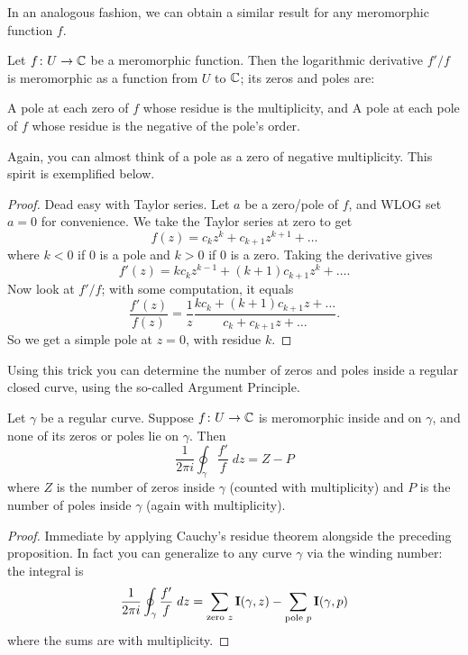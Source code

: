 In an analogous fashion, we can obtain a similar result for any meromorphic function $f$.
\begin{proposition}
	Let $f \colon U \to \mathbb C$ be a meromorphic function.
	Then the logarithmic derivative $f'/f$ is meromorphic as a function from $U$ to $\mathbb C$;
	its zeros and poles are:
	\begin{enumerate}[(i)]
		\ii A pole at each zero of $f$ whose residue is the multiplicity, and
		\ii A pole at each pole of $f$ whose residue is the negative of the pole's order.
	\end{enumerate}
\end{proposition}
Again, you can almost think of a pole as a zero of negative multiplicity.
This spirit is exemplified below.
\begin{proof}
	Dead easy with Taylor series.
	Let $a$ be a zero/pole of $f$, and WLOG set $a=0$ for convenience.
	We take the Taylor series at zero to get
	\[ f(z) = c_k z^k + c_{k+1} z^{k+1} + \dots \] %
	where $k < 0$ if $0$ is a pole and $k > 0$ if $0$ is a zero.
	Taking the derivative gives
	\[ f'(z) = kc_k z^{k-1} + (k+1)c_{k+1}z^{k} + \dots. \]
	Now look at $f'/f$; with some computation, it equals
	\[
		\frac{f'(z)}{f(z)}
		= \frac 1z \frac{kc_k + (k+1)c_{k+1}z + \dots}{c_k + c_{k+1}z + \dots}.
	\]
	So we get a simple pole at $z=0$, with residue $k$.
\end{proof}

Using this trick you can determine the number of zeros and poles inside a regular closed curve,
using the so-called Argument Principle.

\begin{theorem}
	\label{thm:arg_principle}
	Let $\gamma$ be a regular curve.
	Suppose $f \colon U \to \mathbb C$ is meromorphic inside and on $\gamma$, and
	none of its zeros or poles lie on $\gamma$.
	Then
	\[
		\frac{1}{2\pi i} \oint_\gamma \frac{f'}{f} \; dz
		= Z - P
	\]
	where $Z$ is the number of zeros inside $\gamma$ (counted with multiplicity)
	and $P$ is the number of poles inside $\gamma$ (again with multiplicity).
\end{theorem}
\begin{proof}
	Immediate by applying Cauchy's residue theorem alongside the preceding proposition.
	In fact you can generalize to any curve $\gamma$ via the winding number:
	the integral is
	\[ \frac{1}{2\pi i} \oint_\gamma \frac{f'}{f} \; dz
		= \sum_{\text{zero $z$}} \operatorname{\mathbf I}(\gamma,z)
		- \sum_{\text{pole $p$}} \operatorname{\mathbf I}(\gamma,p) \]
	where the sums are with multiplicity.
\end{proof}

